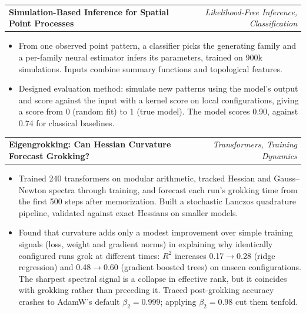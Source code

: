\documentclass[a4paper,10pt]{article}
\makeatletter
\newlength{\sectionlabelwidth}
\newlength{\sectionlabelsep}
\newenvironment{sideSection}[1]{
  \vspace{2.2mm}
  \begin{list}{}{
    \setlength{\leftmargin}{\dimexpr\sectionlabelwidth+\sectionlabelsep\relax}
    \setlength{\labelwidth}{\sectionlabelwidth}
    \setlength{\labelsep}{\sectionlabelsep}
    \setlength{\topsep}{0pt}
    \setlength{\partopsep}{0pt}
    \setlength{\parsep}{0pt}
    \setlength{\itemsep}{0pt}
  }
  \item[{\raisebox{0pt}[\height][0pt]{\parbox[t]{\sectionlabelwidth}{\raggedright\bfseries\small\MakeUppercase{#1}}}}]
  \vspace{-0.6mm}
}{
  \end{list}
}
\newcommand{\socialicon}[1]{\raisebox{-0.05em}{\resizebox{!}{1em}{#1}}}
\newcommand{\resumeProject}[2]{
  \vspace{0.5mm}\item
  \begin{tabular*}{\linewidth}[t]{l@{\extracolsep{\fill}}r}
    \textbf{#1} & \textit{\footnotesize #2}
  \end{tabular*}\par
}
\newcommand{\cvbullet}[1]{%
  {\small\begin{itemize}[leftmargin=0.9em,labelwidth=0.6em,labelsep=0.3em,align=left,
    label=$\circ$,topsep=0.4mm,partopsep=0pt,parsep=0pt,itemsep=0pt]
  \item #1
  \end{itemize}}}
\makeatother
\begin{document}

\begin{sideSection}{Research \& Projects}
\resumeSubHeadingListStart


  \resumeProject
  {Simulation-Based Inference for Spatial Point Processes}
  {Likelihood-Free Inference, Classification}

  \cvbullet{From one observed point pattern, a classifier picks the generating
  family and a per-family neural estimator infers its parameters, trained on 900k simulations.
  Inputs combine summary functions and topological features.}

  \cvbullet{Designed evaluation method: simulate new patterns using the model's output and score against the input
  with a kernel score on local configurations, giving a score from 0 (random fit) to 1 (true model). The model
  scores 0.90, against 0.74 for classical baselines.}


  \resumeProject
  {Eigengrokking: Can Hessian Curvature Forecast Grokking?
  \href{https://github.com/flavio-gualtieri/eigengrokking}{\textcolor{darkblue}{\socialicon{\faGithub}}}
  }
  {Transformers, Training Dynamics}

  \cvbullet{Trained 240 transformers on modular arithmetic, tracked Hessian and Gauss--Newton spectra
  through training, and forecast each run's grokking time from the first 500 steps after
  memorization. Built a stochastic Lanczos quadrature pipeline, validated against exact Hessians
  on smaller models.}

  \cvbullet{Found that curvature adds only a modest improvement over simple training
  signals (loss, weight and gradient norms) in explaining why identically configured runs
  grok at different times: $R^2$ increases 0.17$\to$0.28 (ridge regression) and 0.48$\to$0.60 (gradient boosted trees)
  on unseen configurations. The sharpest spectral signal is a collapse in effective rank,
  but it coincides with grokking rather than preceding it. Traced post-grokking accuracy crashes to
  AdamW's default $\beta_2 = 0.999$; applying $\beta_2 = 0.98$ cut them tenfold.}



\end{sideSection}
\end{document}
